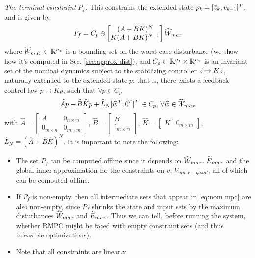 \textit{The terminal constraint $P_f$:}
This constrains the extended state $p_k = [\bar{z}_{k}, v_{k-1}]^T$, and is given by 
\begin{equation}
\label{eq:P_f_def}
P_f = C_p\ominus \left\lbrack \begin{matrix} (A+BK)^N \\ K(A+BK)^{N-1}\end{matrix} \right \rbrack \widehat{W}_{max}
\end{equation}
where $\widehat{W}_{max} \subset \mathbb{R}^{n_z}$ is a bounding set on the worst-case disturbance (we show how it's computed in Sec. \ref{sec:approx dist}),
and $C_p \subset \mathbb{R}^{n_z}\times \mathbb{R}^{n_v}$ is an invariant set of the nominal dynamics subject to the stabilizing controller $\bar{z} \mapsto K\bar{z}$, naturally extended to the extended state $p$:
that is, there exists a feedback control law $p \mapsto \widehat{K}p$, such that $\forall p\in C_p$
\begin{eqnarray}
\label{eq:C_def}
\widehat{A} p + \widehat{B} \widehat{K} p + \widehat{L}_N  [\widehat{w}^T, 0^T]^T \, \in C_p,\, \forall \widehat{w} \in \widehat{W}_{max} 
\end{eqnarray}
with $\widehat{A} = \begin{bmatrix} A & 0_{n \times m} \\ 0_{m \times n} & 0_{m \times m}   \end{bmatrix} $,
$\widehat{B} = \begin{bmatrix}  B \\ \mathbb{I}_{m \times m} \end{bmatrix}$, 
$\widehat{K} = \begin{bmatrix}  K & 0_{m \times m}  \end{bmatrix}$,
$\widehat{L} _N = (\widehat{A} + \widehat{B} \widehat{K})^N$.
It is important to note the following:
\begin{itemize}
	\item The set $P_f$ can be computed offline since it depends on $\widehat{W}_{max}$, $\widetilde{E}_{max}$ and the global inner approximation for the constraints on $v$, $V_{inner-global}$, all of which can be computed offline.
	\item If $P_f$ is non-empty, then all intermediate sets that appear in \eqref{eq:nom mpc} are also non-empty, since $P_f$ shrinks the state and input sets by the maximum disturbances $\widehat{W}_{max}$ and $\widetilde{E}_{max}$.	
	Thus we can tell, before running the system, whether RMPC might be faced with empty constraint sets (and thus infeasible optimizations).
	\item Note that all constraints are linear.x
\end{itemize}


